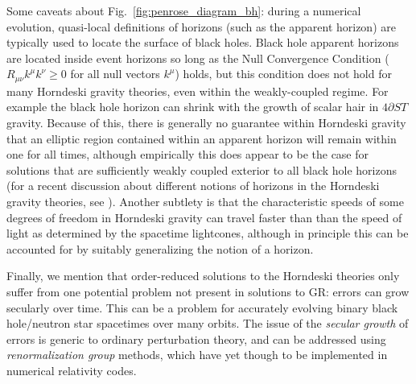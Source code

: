 \documentclass{ws-ijmpd}
\begin{document}
Some caveats about Fig.~\ref{fig:penrose_diagram_bh}:
during a numerical evolution, quasi-local definitions
of horizons (such as the apparent horizon) are typically
used to locate the surface of black holes\cite{Thornburg:2006zb}.
Black hole apparent horizons are located inside event
horizons so long as the Null Convergence Condition
($R_{\mu\nu}k^{\mu}k^{\nu}\geq0$ for all null vectors $k^{\mu}$)
holds\cite{hawking_ellis_1973}, but this condition
does not hold for many Horndeski gravity theories, even
within the weakly-coupled 
regime. For example the black hole
horizon can shrink with the growth of scalar
hair in $4\partial ST$ gravity\cite{Ripley:2019irj,Ripley:2019aqj,
Ripley:2020vpk,East:2020hgw,East:2021bqk}.
Because of this, there is generally no guarantee within Horndeski gravity that
an elliptic region contained within an apparent horizon will
remain within one for all times, although empirically
this does appear to be the case for solutions that 
are sufficiently weakly coupled exterior to all black 
hole horizons\cite{Ripley:2019irj,Ripley:2019aqj,
Ripley:2020vpk,East:2020hgw,East:2021bqk,Figueras:2020dzx,Figueras:2021abd}
(for a recent discussion about different notions of horizons in the
Horndeski gravity theories, see
).
Another subtlety is that the characteristic speeds of some degrees of freedom
in Horndeski gravity can travel faster than than the speed of light
as determined by the spacetime lightcones\cite{Akhoury:2011hr},
although in principle this can be accounted for by suitably
generalizing the notion of a horizon\cite{Reall:2021voz}.


Finally, we mention that order-reduced solutions to the Horndeski theories
only suffer from one potential problem not present in solutions
to GR: errors can grow secularly over time.
This can be a problem for accurately evolving binary black hole/neutron star
spacetimes over many orbits.
The issue of the \emph{secular growth} of errors is generic
to ordinary perturbation theory, and can be addressed using
\emph{renormalization group} methods, which have yet though
to be implemented in numerical relativity codes.

\end{document}
